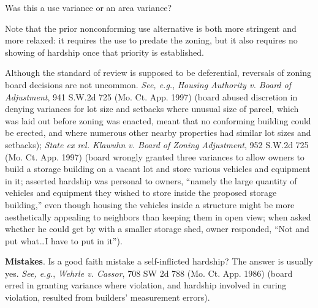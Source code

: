 
\item Was this a use variance or an area variance? 

\item
Note that the prior nonconforming use alternative is both more stringent and
more relaxed: it requires the use to predate the zoning, but it also requires no
showing of hardship once that priority is established.

\item
Although the standard of review is supposed to be deferential, reversals of
zoning board decisions are not uncommon. \textit{See, e.g.}, \emph{Housing
Authority v. Board of Adjustment},
941 S.W.2d 725 (Mo. Ct. App. 1997) (board abused discretion in denying
variances for lot size and setbacks where unusual size of parcel, which was laid
out before zoning was enacted, meant that no conforming building could be
erected, and where numerous other nearby properties had similar lot sizes and
setbacks); \emph{State ex rel. Klawuhn v. Board of Zoning Adjustment},
952 S.W.2d 725 (Mo. Ct. App. 1997) (board wrongly granted three
variances to allow owners to build a storage building on a vacant lot and store
various vehicles and equipment in it; asserted hardship was personal to owners,
``namely the large quantity of vehicles and equipment they wished to store
inside the proposed storage building,'' even though housing the vehicles inside
a structure might be more aesthetically appealing to neighbors than keeping them
in open view; when asked whether he could get by with a smaller storage shed,
owner responded, ``Not and put what\ldots I have to put in it''). 

\item
\textbf{Mistakes}. Is a good faith mistake a self-inflicted hardship? The answer
is usually yes. \textit{See, e.g.}, \emph{Wehrle v. Cassor}, 708 SW 2d 788 (Mo.
Ct. App. 1986) (board erred in granting variance where violation, and hardship
involved in curing violation, resulted from builders' measurement errors).

